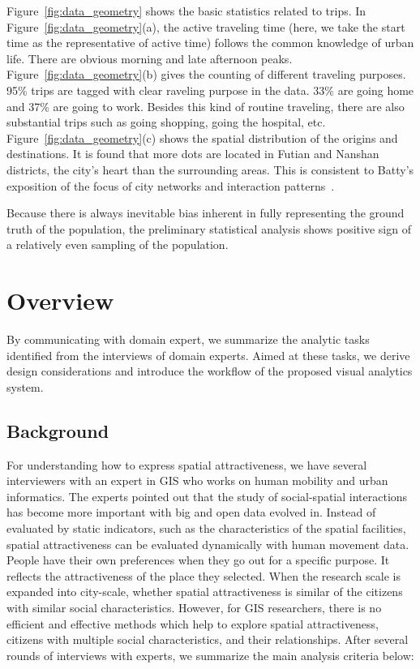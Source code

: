 Figure~\ref{fig:data_geometry} shows the basic statistics related to trips. In Figure~\ref{fig:data_geometry}(a), the active traveling time (here, we take the start time as the representative of active time) follows the common knowledge of urban life. There are obvious morning and late afternoon peaks. Figure~\ref{fig:data_geometry}(b) gives the counting of different traveling purposes. 95\% trips are tagged with clear raveling purpose in the data. 33\% are going home and 37\% are going to work. Besides this kind of routine traveling, there are also substantial trips such as going shopping, going the hospital, etc. Figure~\ref{fig:data_geometry}(c) shows the spatial distribution of the origins and destinations. It is found that more dots are located in Futian and Nanshan districts, the city's heart than the surrounding areas. This is consistent to Batty's exposition of the focus of city networks and interaction patterns~\citep{batty2013new}.

Because there is always inevitable bias inherent in fully representing the ground truth of the population, the preliminary statistical analysis shows positive sign of a relatively even sampling of the population.

\section{Overview}
By communicating with domain expert, we summarize the analytic tasks identified from the interviews of domain experts. Aimed at these tasks, we derive design considerations and introduce the workflow of the proposed visual analytics system.

\subsection{Background}

For understanding how to express spatial attractiveness, we have several interviewers with an expert in GIS who works on human mobility and urban informatics. The experts pointed out that the study of social-spatial interactions has become more important with big and open data evolved in. Instead of evaluated by static indicators, such as the characteristics of the spatial facilities, spatial attractiveness can be evaluated dynamically with human movement data. People have their own preferences when they go out for a specific purpose. It reflects the attractiveness of the place they selected. When the research scale is expanded into city-scale, whether spatial attractiveness is similar of the citizens with similar social characteristics. However, for GIS researchers, there is no efficient and effective methods which help to explore spatial attractiveness, citizens with multiple social characteristics, and their relationships. After several rounds of interviews with experts, we summarize the main analysis criteria below:

